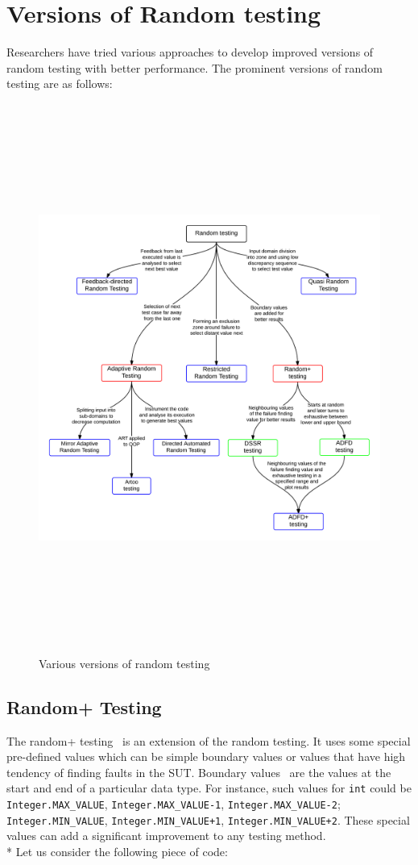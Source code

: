 \section{Versions of Random testing}
Researchers have tried various approaches to develop improved versions of random testing with better performance. The prominent versions of random testing are as follows:
\begin{figure}[H]
	\centering
	\centerline{\includegraphics[width=16.5cm, height=18cm]{chapter2/randomTestingVariations.png}}
	\caption{Various versions of random testing}
	\label{fig:randomTestingVersions_2}
\end{figure}

\subsection{Random+ Testing}
The random+ testing~\cite{leitner2007reconciling} is an extension of the random testing. It uses some special pre-defined values which can be simple boundary values or values that have high tendency of finding faults in the SUT. Boundary values~\cite{beizer2003software} are the values at the start and end of a particular data type. For instance, such values for \verb+int+ could be \verb+Integer.MAX_VALUE+, \verb+Integer.MAX_VALUE-1+, \verb+Integer.MAX_VALUE-2+; \verb+Integer.MIN_VALUE+, \verb-Integer.MIN_VALUE+1-, \verb-Integer.MIN_VALUE+2-. These special values can add a significant improvement to any testing method. \\*
Let us consider the following piece of code:

